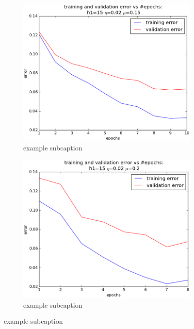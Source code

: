 \begin{figure}[!ht]
	\centering
	\begin{subfigure}[b]{.45\textwidth}
	\centering
	\includegraphics[width=\textwidth]{mlp/plots/4-9_tuned_97_75.eps}
	\caption{example subcaption}
	\label{fig:4_9_tuned}
	\end{subfigure}
	\quad
	\begin{subfigure}[b]{.45\textwidth}
	\centering
	\includegraphics[width=\textwidth]{mlp/plots/3-5_tuned_97_75.eps}
	\caption{example subcaption}
	\label{fig:3_5_tuned}
	\end{subfigure}

\end{figure}
